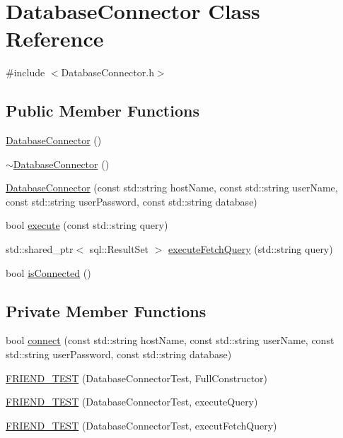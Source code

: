 \hypertarget{classDatabaseConnector}{
\section{DatabaseConnector Class Reference}
\label{classDatabaseConnector}
}


{\ttfamily \#include $<$DatabaseConnector.h$>$}\subsection*{Public Member Functions}
\begin{DoxyCompactItemize}
\item 
\hyperlink{classDatabaseConnector_af371bd32e0f186f1de9fa487872eb1c1}{DatabaseConnector} ()
\item 
\hyperlink{classDatabaseConnector_a4312f4426fbfd8519bea54c919c27c6a}{$\sim$DatabaseConnector} ()
\item 
\hyperlink{classDatabaseConnector_a502670eae16b1bcf0e102b337b27217c}{DatabaseConnector} (const std::string hostName, const std::string userName, const std::string userPassword, const std::string database)
\item 
bool \hyperlink{classDatabaseConnector_afe792ae1d992ef8ad46b4d9d96e4f046}{execute} (const std::string query)
\item 
std::shared\_\-ptr$<$ sql::ResultSet $>$ \hyperlink{classDatabaseConnector_afa1229f85d1ce3aa08a8efe20355f1a8}{executeFetchQuery} (std::string query)
\item 
bool \hyperlink{classDatabaseConnector_afa04c403cef3e677957fe6a95b196856}{isConnected} ()
\end{DoxyCompactItemize}
\subsection*{Private Member Functions}
\begin{DoxyCompactItemize}
\item 
bool \hyperlink{classDatabaseConnector_aa1ee4bc9db8a6a0649cb0445f603bc3d}{connect} (const std::string hostName, const std::string userName, const std::string userPassword, const std::string database)
\item 
\hyperlink{classDatabaseConnector_ab0a36921c33a4a57e3d9f45b246d3a00}{FRIEND\_\-TEST} (DatabaseConnectorTest, FullConstructor)
\item 
\hyperlink{classDatabaseConnector_ac413c913beb4dc0539a40383def2e750}{FRIEND\_\-TEST} (DatabaseConnectorTest, executeQuery)
\item 
\hyperlink{classDatabaseConnector_a1b954199c3e493a12edb9b339ad26103}{FRIEND\_\-TEST} (DatabaseConnectorTest, executFetchQuery)
\end{DoxyCompactItemize}
